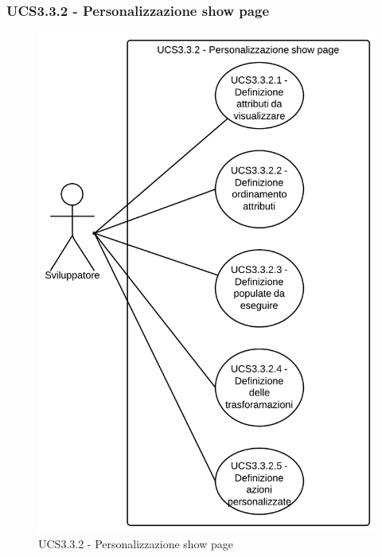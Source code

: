\subsubsection{UCS3.3.2 - Personalizzazione show page} 
    \begin{figure}[H]
      \begin{center}
      \includegraphics[scale=0.16]{UML/UCS3.3.2 - Personalizzazione show page.png}
      \caption{UCS3.3.2 - Personalizzazione show page}
      \end{center} 
    \end{figure}  
    
